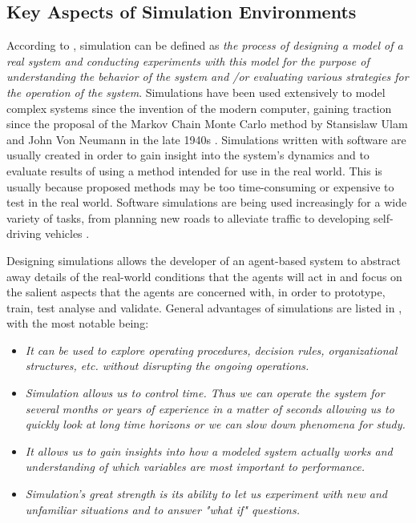 \subsection{Key Aspects of Simulation Environments}
According to \citeauthor{Shannon1998INTRODUCTIONSIMULATION} \cite{Shannon1998INTRODUCTIONSIMULATION}, simulation can be defined as \textit{ the process of designing
a model of a real system and conducting experiments with
this model for the purpose of understanding the behavior of
the system and /or evaluating various strategies for the
operation of the system}. Simulations have been used extensively to model complex systems since the invention of the modern computer, gaining traction since the proposal of the Markov Chain Monte Carlo method by Stansislaw Ulam and John Von Neumann in the late 1940s \cite{Robert2011AIncomplete}. Simulations written with software are usually created in order to gain insight into the system's dynamics and to evaluate results of using a method intended for use in the real world. This is usually because proposed methods may be too time-consuming or expensive to test in the real world. Software simulations are being used increasingly for a wide variety of tasks, from planning new roads to alleviate traffic \cite{Pell2017TrendsSimulation} to developing self-driving vehicles \cite{Dosovitskiy2017CARLA:Simulator}. 

Designing simulations allows the developer of an agent-based system to abstract away details of the real-world conditions that the agents will act in and focus on the salient aspects that the agents are concerned with, in order to prototype, train, test analyse and validate. General advantages of simulations are listed in  \cite{Shannon1998INTRODUCTIONSIMULATION}, with the most notable being:
\begin{itemize}
    \item \textit{It can be used to explore operating procedures, decision rules, organizational structures, etc. without disrupting the ongoing operations.}
    \item \textit{Simulation allows us to control time. Thus we can operate the system for several months or years of experience in a matter of seconds allowing us to quickly look at long time horizons or we can slow down phenomena for study.}
    \item \textit{It allows us to gain insights into how a modeled system actually works and understanding of which variables are most important to performance.}
    \item \textit{Simulation's great strength is its ability to let us experiment with new and unfamiliar situations and to answer "what if" questions.}
\end{itemize}


